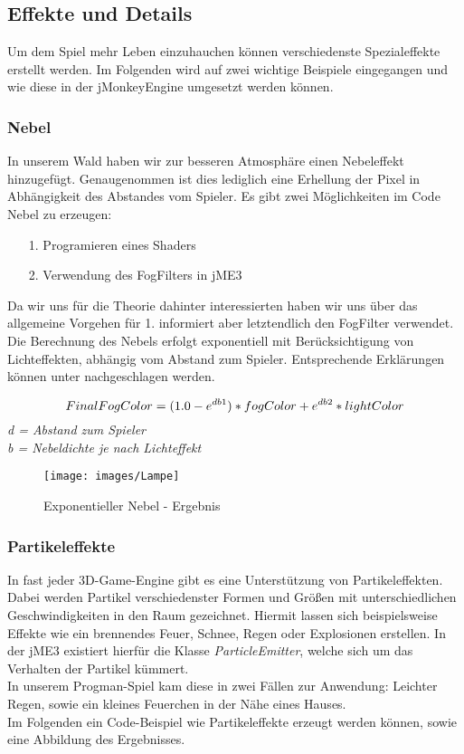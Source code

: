 \subsection{Effekte und Details}
Um dem Spiel mehr Leben einzuhauchen können verschiedenste Spezialeffekte erstellt werden. Im Folgenden wird auf zwei wichtige Beispiele eingegangen und wie diese in der jMonkeyEngine umgesetzt werden können.

\subsubsection{Nebel}
In unserem Wald haben wir zur besseren Atmosphäre einen Nebeleffekt hinzugefügt. Genaugenommen ist dies lediglich eine Erhellung der Pixel in Abhängigkeit des Abstandes vom Spieler. Es gibt zwei Möglichkeiten im Code Nebel zu erzeugen:

\begin{enumerate}
	\item[1.] Programieren eines Shaders 
	\item[2.] Verwendung des FogFilters in jME3
\end{enumerate}
Da wir uns für die Theorie dahinter interessierten haben wir uns über das allgemeine Vorgehen für 1. informiert aber letztendlich den FogFilter verwendet.
Die Berechnung des Nebels erfolgt exponentiell mit Berücksichtigung von Lichteffekten, abhängig vom Abstand zum Spieler. Entsprechende Erklärungen können unter \cite{Cr14} nachgeschlagen werden.

\begin{equation}
	FinalFogColor = (1.0-e^{db\textrm{1}})*fogColor + e^{db\textrm{2}} * lightColor \\
\end{equation} \emph{
	d = Abstand zum Spieler} \\
	\emph{b = Nebeldichte je nach Lichteffekt} 


\begin{figure}[H]
	\myfloatalign
	
	\texttt{[image: images/Lampe]} 
	\caption{Exponentieller Nebel - Ergebnis}
	
\end{figure}

\subsubsection{Partikeleffekte}
In fast jeder 3D-Game-Engine gibt es eine Unterstützung von Partikeleffekten. Dabei werden Partikel verschiedenster Formen und Größen mit unterschiedlichen Geschwindigkeiten in den Raum gezeichnet. Hiermit lassen sich beispielsweise Effekte wie ein brennendes Feuer, Schnee, Regen oder Explosionen erstellen. In der jME3 existiert hierfür die Klasse \emph{ParticleEmitter}, welche sich um das Verhalten der Partikel kümmert.\\
In unserem Progman-Spiel kam diese in zwei Fällen zur Anwendung: Leichter Regen, sowie ein kleines Feuerchen in der Nähe eines Hauses.\\ Im Folgenden ein Code-Beispiel wie Partikeleffekte erzeugt werden können, sowie eine Abbildung des Ergebnisses.


